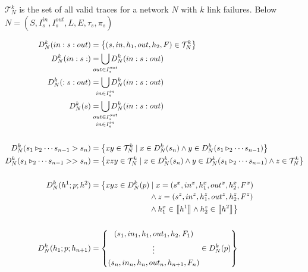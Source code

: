 \documentclass[preview]{standalone}
\begin{document}
$\mathcal{T}_N^k$ is the set of all valid traces for a network $N$ with
$k$ link failures. Below $N = (S, I_s^{in}, I_s^{out}, L, E, \tau{}_s,
\pi{}_s)$

\begin{align*}
	D_N^k(in : s : out) &= 
		\bigl\{ (s, in, h_1, out, h_2, F) \in \mathcal{T}_N^k \bigr\}
		\\
	D_N^k(in : s :) &= \bigcup_{\mathclap{out \in I^{out}_s}}
		D_N^k(in : s : out)
		\\
	D_N^k(: s : out) &= \bigcup_{\mathclap{in \in I^{in}_s}}
		D_N^k(in : s : out)
		\\
	D_N^k(s) &= \bigcup_{%
		\mathclap{\substack{out \in I^{out}_s \\in \in I^{in}_s}}}
		D_N^k(in : s : out)
		\\
		\\
	D_N^k(s_1 \triangleright_2 \dotsb s_{n-1} > s_n) &=
		\left\{ xy \in \mathcal{T}_N^k \mid x \in D_N^k(s_n) \wedge
		y \in D_N^k(s_1 \triangleright_2 \dotsb s_{n-1}) \right\}
		\\
	D_N^k(s_1 \triangleright_2 \dotsb s_{n-1} >> s_n) &=
		\left\{ xzy \in \mathcal{T}_N^k \mid x \in D_N^k(s_n) \wedge
		y \in D_N^k(s_1 \triangleright_2 \dotsb s_{n-1}) \wedge z \in
	\mathcal{T}_N^k \right\}
		\\
		\\
		D_N^k(h^1; p; h^2) &= 
		\begin{aligned}[t]
			\bigl\{ xyz \in D_N^k(p) &\mid{}
			x = (s^x, in^x, h_1^x, out^x, h_2^x, F^x)\\
			&\wedge{}z = (s^z, in^z, h_1^z, out^z, h_2^z, F^z)\\
			&\wedge{} h_1^x \in \left\llbracket h^1 \right\rrbracket
			\wedge{} h_2^z \in \left\llbracket h^2 \right\rrbracket
			\bigr\}
		\end{aligned}
		\\
		\\
		D_N^k(h_1; p; h_{n+1}) &= 
			\left\{ 
			\begin{gathered}
				(s_1, in_1, h_1, out_1, h_2, F_1)\\
				\vdots\\
				(s_n, in_n, h_n, out_n, h_{n+1}, F_n)
			\end{gathered}
			\in D_N^k(p) \right\}
\end{align*}
\end{document}
